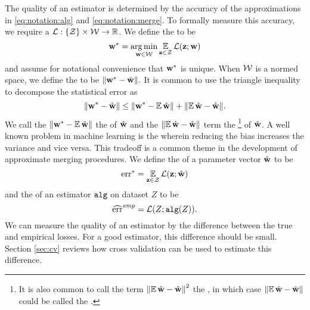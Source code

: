 \documentclass[thesis.tex]{subfiles}
\newcommand{\riskstar}{{\textrm{err}^*}}
\newcommand{\riskemp}{\widehat{\textrm{err}}^\textit{emp}}
\newcommand{\alg}{\mkprocedure{alg}}
\begin{document}
The quality of an estimator is determined by the accuracy of the approximations in \eqref{eq:notation:alg} and \eqref{eq:notation:merge}.
To formally measure this accuracy, 
we require a  $\mathcal{L} : \{{\mathcal Z}\} \times {\mathcal W} \to \mathbb R$. 
We define the  to be 
\begin{equation}
    {\mathbf w^{*}} = \operatorname*{arg\,min}_{\mathbf w\in{\mathcal W}} \operatorname*{\mathbb E}_{\mathbf z\in{\mathcal Z}}\mathcal{L}(\mathbf z;\mathbf w)
\end{equation}
and assume for notational convenience that ${\mathbf w^{*}}$ is unique.
When ${\mathcal W}$ is a normed space, we define the  to be
$
    {\lVert {{\mathbf w^{*}}-{\hat{\mathbf w}}} \rVert}
    .
$
It is common to use the triangle inequality to decompose the statistical error as
\begin{equation}
    {\lVert {{\mathbf w^{*}}-{\hat{\mathbf w}}} \rVert}
    \le
    {\lVert {{\mathbf w^{*}}-\operatorname*{\mathbb E}{\hat{\mathbf w}}} \rVert}
    +
    {\lVert {\operatorname*{\mathbb E}{\hat{\mathbf w}}-{\hat{\mathbf w}}} \rVert}
    .
\end{equation}
We call the ${\lVert {{\mathbf w^{*}}-\operatorname*{\mathbb E}{\hat{\mathbf w}}} \rVert}$ the  of ${\hat{\mathbf w}}$ and the ${\lVert {\operatorname*{\mathbb E}{\hat{\mathbf w}}-{\hat{\mathbf w}}} \rVert}$ term the %
\footnote{
    It is also common to call the term ${\lVert {\operatorname*{\mathbb E}{\hat{\mathbf w}}-{\hat{\mathbf w}}} \rVert}^2$ the ,
    in which case ${\lVert {\operatorname*{\mathbb E}{\hat{\mathbf w}}-{\hat{\mathbf w}}} \rVert}$ could be called the .
}
of ${\hat{\mathbf w}}$.
A well known problem in machine learning is the  wherein reducing the bias increases the variance and vice versa.
This tradeoff is a common theme in the development of approximate merging procedures.
We define the  of a parameter vector ${\hat{\mathbf w}}$ to be
\begin{equation}
    \riskstar = \E_{\z\in\Z}\Loss(\z;\what)
\end{equation}
and the  of an estimator $\alg$ on dataset $Z$ to be 
\begin{equation}
    \riskemp{} = \Loss(Z;\alg(Z))
    .
\end{equation}
We can measure the quality of an estimator by the difference between the true and empirical losses.
For a good estimator, this difference should be small.
Section \ref{sec:cv} reviews how cross validation can be used to estimate this difference.
\end{document}

